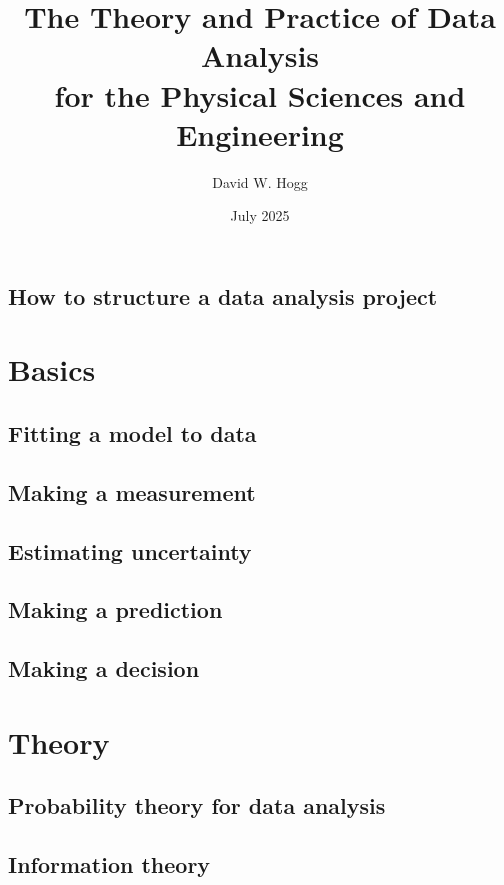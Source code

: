 \documentclass[10pt]{book}
\title{\bfseries%
The Theory and Practice of Data Analysis \\
for the Physical Sciences and Engineering}
\author{David W. Hogg}
\date{July 2025}
\begin{document}
\maketitle
\tableofcontents



\chapter{How to structure a data analysis project}

\part{Basics}

\chapter{Fitting a model to data}

\chapter{Making a measurement}

\chapter{Estimating uncertainty}

\chapter{Making a prediction}

\chapter{Making a decision}

\part{Theory}

\chapter{Probability theory for data analysis}

\chapter{Information theory}
\end{document}
